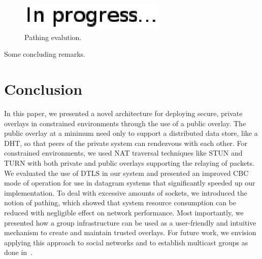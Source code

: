 \documentclass[conference]{IEEEtran}
\begin{document}
\begin{figure}[h]
\centering
\includegraphics[width=2.75in]{in_progress.eps}
\caption{Pathing evalution.}
\label{fig:pathing_eval}
\end{figure}

Some concluding remarks.

\section{Conclusion}
\label{conclusions}
In this paper, we presented a novel architecture for deploying secure, private
overlays in constrained environments through the use of a public overlay.
The public overlay at a minimum need only to support a distributed data store,
like a DHT, so that peers of the private system can rendezvous with each other.
For constrained environments, we used NAT traversal techniques like STUN and
TURN with both private and public overlays supporting the relaying of packets.
We evaluated the use of DTLS in our system and presented an improved CBC
mode of operation for use in datagram systems that significantly speeded up our
implementation.  To deal with excessive amounts of sockets, we introduced the
notion of pathing, which showed that system resource consumption can be reduced
with negligible effect on network performance.  Most importantly, we presented
how a group infrastructure can be used as a user-friendly and intuitive
mechanism to create and maintain trusted overlays.  For future work, we envision
applying this approach to social networks and to establish multicast groups as
done in~\cite{can}.



\suppressfloats
\end{document}
